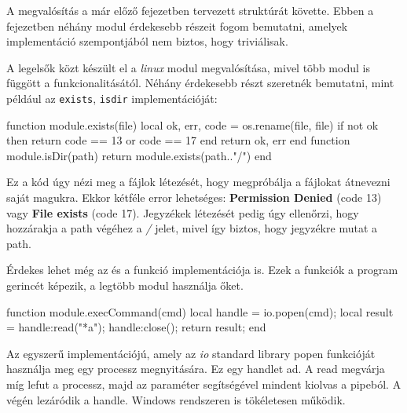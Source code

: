 
A megvalósítás a már előző fejezetben tervezett struktúrát követte. Ebben a fejezetben néhány modul érdekesebb részeit fogom bemutatni, amelyek implementáció szempontjából nem biztos, hogy triviálisak.


A legelsők közt készült el a \textit{linux} modul megvalósítása, mivel több modul is függött a funkcionalitásától. Néhány érdekesebb részt szeretnék bemutatni, mint például az \texttt{exists}, \texttt{isdir} implementációját:

\begin{lua}
function module.exists(file)
  local ok, err, code = os.rename(file, file)
  if not ok then
    return code == 13 or code == 17
  end
  return ok, err
end
function module.isDir(path)
  return module.exists(path.."/")
end
\end{lua}

Ez a kód úgy nézi meg a fájlok létezését, hogy megpróbálja a fájlokat átnevezni saját magukra. Ekkor kétféle error lehetséges: \textbf{Permission Denied} (code 13) vagy \textbf{File exists} (code 17). Jegyzékek létezését pedig úgy ellenőrzi, hogy hozzárakja a path végéhez a \textit{/} jelet, mivel így biztos, hogy jegyzékre mutat a path.

Érdekes lehet még az \texttt{} és a \texttt{} funkció implementációja is. Ezek a funkciók a program gerincét képezik, a legtöbb modul használja őket.

\begin{lua}
function module.execCommand(cmd)
  local handle = io.popen(cmd);
  local result = handle:read("*a");
  handle:close();
  return result;
end
\end{lua}

Az \texttt{} egyszerű implementációjú, amely az \textit{io} standard library popen funkcióját használja meg egy processz megnyitására. Ez egy handlet ad. A read megvárja míg lefut a processz, majd az \textit{} paraméter segítségével mindent kiolvas a pipeból. A végén lezáródik a handle. Windows rendszeren is tökéletesen működik.

